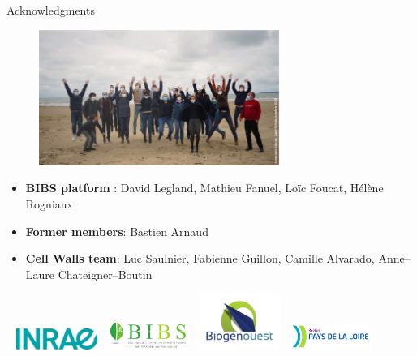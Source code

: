 \documentclass[10pt]{beamer}
\begin{document}
\begin{frame}{Acknowledgments}
  \begin{figure}[ht]
      \centering
      \includegraphics[width=0.7\textwidth]{fig/photoequipe}
    \end{figure}
    
    {\scriptsize
  \begin{itemize}
  \item \textbf{BIBS platform} : David Legland, Mathieu Fanuel, Loïc Foucat, Hélène Rogniaux
  \item \textbf{Former members}: Bastien Arnaud
  \item \textbf{Cell Walls team}: Luc Saulnier, Fabienne Guillon, Camille Alvarado, Anne--Laure Chateigner--Boutin
  \end{itemize}
}
\vspace{-0.7cm}
  \hspace*{0.01\textwidth}~%
  \includegraphics[width=0.2\textwidth]{fig/logo-inrae}\hspace*{0.075\textwidth}~%
  \includegraphics[width=0.2\textwidth]{fig/logo-bibs.png}\hspace*{0.075\textwidth}~%
  \includegraphics[width=0.2\textwidth]{fig/logo-biogenouest}\hspace*{0.075\textwidth}~%
  \includegraphics[width=0.2\textwidth]{fig/logo-region}\hspace*{0.01\textwidth}~%

\end{frame}
\end{document}
